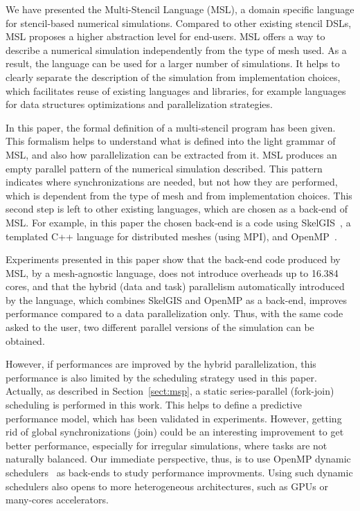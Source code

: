
We have presented the Multi-Stencil Language (MSL), a domain specific language for stencil-based numerical simulations. Compared to other existing stencil DSLs, MSL proposes a higher abstraction level for end-users. MSL offers a way to describe a numerical simulation independently from the type of mesh used. As a result, the language can be used for a larger number of simulations. It helps to clearly separate the description of the simulation from implementation choices, which facilitates reuse of existing languages and libraries, for example languages for data structures optimizations and parallelization strategies. 

In this paper, the formal definition of a multi-stencil program has been given. This formalism helps to understand what is defined into the light grammar of MSL, and also how parallelization can be extracted from it. MSL produces an empty parallel pattern of the numerical simulation described. This pattern indicates where synchronizations are needed, but not how they are performed, which is dependent from the type of mesh and from implementation choices. This second step is left to other existing languages, which are chosen as a back-end of MSL. For example, in this paper the chosen back-end is a code using SkelGIS~\cite{CPE:CPE3494,DBLP:conf/ieeehpcs/HeleneS13,DBLP:conf/europar/CoullonL14}, a templated C++ language for distributed meshes (using MPI), and OpenMP~\cite{660313}.

Experiments presented in this paper show that the back-end code produced by MSL, \ie by a mesh-agnostic language, does not introduce overheads up to 16.384 cores, and that the hybrid (data and task) parallelism automatically introduced by the language, which combines SkelGIS and OpenMP as a back-end, improves performance compared to a data parallelization only. Thus, with the same code asked to the user, two different parallel versions of the simulation can be obtained.

However, if performances are improved by the hybrid parallelization, this performance is also limited by the scheduling strategy used in this paper. Actually, as described in Section~\ref{sect:msp}, a static series-parallel (fork-join) scheduling is performed in this work. This helps to define a predictive performance model, which has been validated in experiments. However, getting rid of global synchronizations (join) could be an interesting improvement to get better performance, especially for irregular simulations, where tasks are not naturally balanced. Our immediate perspective, thus, is to use OpenMP dynamic schedulers~\cite{Gautier:2013:XRS:2510661.2511383,Augonnet2011,wu:hal-01078359} as back-ends to study performance improvments. Using such dynamic schedulers also opens to more heterogeneous architectures, such as GPUs or many-cores accelerators.

